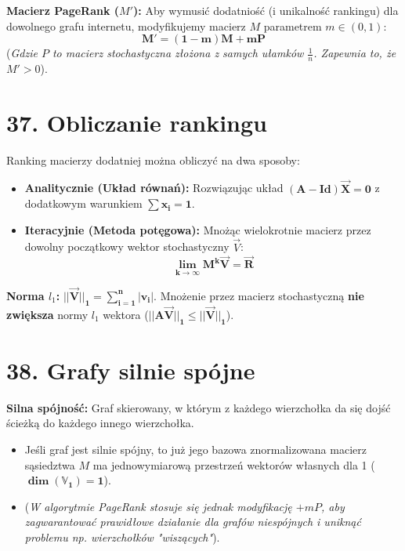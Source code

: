 \documentclass[12pt,a4paper]{article}
\begin{document}
\noindent\textbf{Macierz PageRank ($M'$):} Aby wymusić dodatniość (i unikalność rankingu) dla dowolnego grafu internetu, modyfikujemy macierz $M$ parametrem $m \in (0, 1)$: %
$$ \mathbf{M' = (1-m)M + m P} $$ %
(\textit{Gdzie $P$ to macierz stochastyczna złożona z samych ułamków $\frac{1}{n}$. Zapewnia to, że $M' > 0$}). %

\section*{37. Obliczanie rankingu}
Ranking macierzy dodatniej można obliczyć na dwa sposoby: %
\begin{itemize}
    \item \textbf{Analitycznie (Układ równań):} Rozwiązując układ $\mathbf{(A - Id)\vec{X} = 0}$ z dodatkowym warunkiem $\mathbf{\sum x_i = 1}$. %
    \item \textbf{Iteracyjnie (Metoda potęgowa):} Mnożąc wielokrotnie macierz przez dowolny początkowy wektor stochastyczny $\vec{V}$: %
    $$ \mathbf{\lim_{k \to \infty} M^k \vec{V} = \vec{R}} $$ %
\end{itemize}

\noindent\textbf{Norma $l_1$:} $\mathbf{||\vec{V}||_1 = \sum_{i=1}^n |v_i|}$. Mnożenie przez macierz stochastyczną \textbf{nie zwiększa} normy $l_1$ wektora ($\mathbf{||A\vec{V}||_1 \le ||\vec{V}||_1}$). %

\section*{38. Grafy silnie spójne}
\noindent\textbf{Silna spójność:} Graf skierowany, w którym z każdego wierzchołka da się dojść ścieżką do każdego innego wierzchołka. %
\begin{itemize}
    \item Jeśli graf jest silnie spójny, to już jego bazowa znormalizowana macierz sąsiedztwa $M$ ma jednowymiarową przestrzeń wektorów własnych dla 1 ($\mathbf{\dim(\mathbb{V}_1) = 1}$). %
    \item (\textit{W algorytmie PageRank stosuje się jednak modyfikację $+ mP$, aby zagwarantować prawidłowe działanie dla grafów niespójnych i uniknąć problemu np. wierzchołków "wiszących"}). %
\end{itemize}
\end{document}
